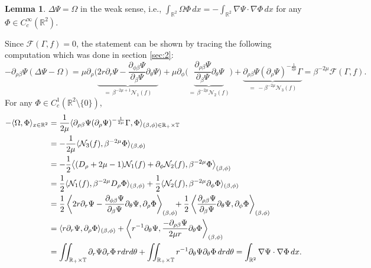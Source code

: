 \documentclass[11pt]{article}
\makeatletter
\renewenvironment{proof}[1][\proofname]{\par
  \vspace{-.7\topsep}%
  \pushQED{\qed}%
  \normalfont
  \topsep0pt \partopsep0pt %
  \trivlist
  \item[\hskip\labelsep
        \itshape
    #1\@addpunct{.}]\ignorespaces
}{%
  \popQED\endtrivlist\@endpefalse
  \addvspace{6pt plus 6pt} %
}
\theoremstyle{definition}
\newtheorem{lemma}[theorem]{Lemma}
\theoremstyle{remark}
\numberwithin{equation}{section}
\newcommand{\mbb}{\mathbb}
\newcommand{\mcal}{\mathcal}
\newcommand{\R}{\mbb{R}}
\newcommand{\del}{\partial}
\newcommand{\grad}{\nabla}
\makeatother
\begin{document}
\begin{lemma} \label{lem:5.7}
$\Delta \Psi = \Omega$ in the weak sense, i.e., $\int_{\R^2} \Omega \Phi \,dx = -\int_{\R^2} \grad \Psi \cdot \grad \Phi \,dx$ for any $\Phi \in C^\infty_c(\R^2)$.
\end{lemma}
\begin{proof}
Since $\mcal{F}(\Gamma, f) = 0$, the statement can be shown by tracing the following computation which was done in section \ref{sec:2}:
\[-\del_{\rho\beta} \Psi (\Delta \Psi - \Omega) = \mu \del_\rho \bigg( \underbrace{2r\del_r \Psi - \frac{\del_{\phi\beta} \Psi}{\del_\beta \Psi} \del_\theta \Psi}_{=\, \beta^{-2\mu+1} \mcal{N}_1(f)} \bigg) + \mu \del_\phi \bigg( \underbrace{\frac{\del_{\rho\beta}\Psi}{\del_{\beta}\Psi} \del_\theta \Psi}_{=\, \beta^{-2\mu} \mcal{N}_2(f)} \bigg) + \underbrace{\del_{\rho\beta}\Psi (\del_\rho \Psi)^{-\frac{1}{2\mu}} \Gamma}_{=\, -\beta^{-2\mu} \mcal{N}_3(f)} = \beta^{-2\mu}  \mcal{F}(\Gamma, f).\]
For any $\Phi\in C^1_c(\R^2 \setminus \{0\})$,
{\allowdisplaybreaks\begin{align*}
-\langle \Omega, \Phi \rangle_{x\in \R^2} &= \frac{1}{2\mu} \langle \del_{\rho\beta} \Psi (\del_\rho \Psi)^{-\frac{1}{2\mu}} \Gamma, \Phi \rangle_{(\beta, \phi)\in \R_+ \times \mbb{T}} \\
& = -\frac{1}{2\mu} \langle \mcal{N}_3(f), \beta^{-2\mu} \Phi \rangle_{(\beta, \phi)} \\
& = -\frac{1}{2} \big\langle (D_\rho + 2\mu - 1) \mcal{N}_1(f) + \del_\phi \mcal{N}_2(f) , \beta^{-2\mu} \Phi \big\rangle_{(\beta, \phi)} \\
& = \frac{1}{2} \langle \mcal{N}_1(f), \beta^{-2\mu} D_\rho\Phi \rangle_{(\beta, \phi)} + \frac{1}{2} \langle \mcal{N}_2(f), \beta^{-2\mu} \del_\phi \Phi \rangle_{(\beta, \phi)} \\
& = \frac{1}{2} \left\langle 2r\del_r \Psi - \frac{\del_{\phi\beta} \Psi}{\del_\beta \Psi} \del_\theta \Psi, \del_\rho\Phi \right\rangle_{(\beta, \phi)} \hspace{-.5em} + \frac{1}{2} \left\langle \frac{\del_{\rho\beta}\Psi}{\del_{\beta}\Psi} \del_\theta \Psi, \del_\phi\Phi \right\rangle_{(\beta, \phi)} \\
& = \langle r\del_r \Psi, \del_\rho\Phi \rangle_{(\beta,\phi)} + \left\langle r^{-1} \del_\theta \Psi, \frac{- \del_{\rho\beta}\Psi}{2\mu r} \del_\theta \Phi \right\rangle_{(\beta,\phi)} \\
& = \iint_{\R_+ \times \mbb{T}} \del_r\Psi \del_r \Phi  \,r dr d\theta + \iint_{\R_+ \times \mbb{T}} r^{-1} \del_\theta \Psi \del_\theta \Phi \, dr d\theta = \int_{\R^2} \grad \Psi \cdot \grad \Phi \,dx.

\end{align*}}
\end{proof}
\end{document}
